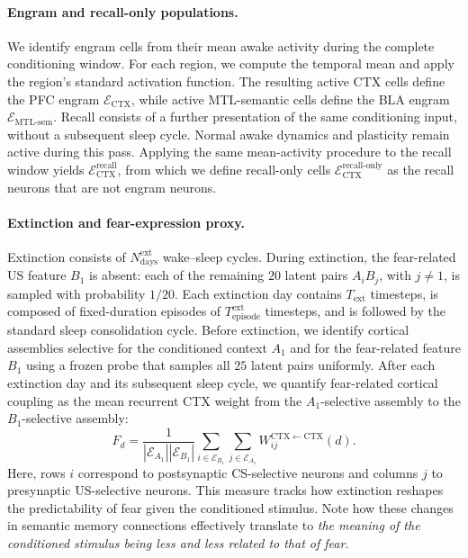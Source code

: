 \documentclass{article}
\begin{document}
\paragraph{Engram and recall-only populations.}
We identify engram cells from their mean awake activity during the complete conditioning window. For each region, we compute the temporal mean and apply the region's standard activation function. The resulting active CTX cells define the PFC engram $\mathcal{E}_{\textrm{CTX}}$, while active MTL-semantic cells define the BLA engram $\mathcal{E}_{\textrm{MTL-sem}}$.
\newline\newline
Recall consists of a further presentation of the same conditioning input, without a subsequent sleep cycle. Normal awake dynamics and plasticity remain active during this pass. Applying the same mean-activity procedure to the recall window yields $\mathcal{E}_{\textrm{CTX}}^{\textrm{recall}}$, from which we define recall-only cells $\mathcal{E}_{\textrm{CTX}}^{\textrm{recall-only}}$ as the recall neurons that are not engram neurons.
\newline\newline
\paragraph{Extinction and fear-expression proxy.}
Extinction consists of $N_{\textrm{days}}^{\textrm{ext}}$ wake--sleep cycles. During extinction, the fear-related US feature $B_1$ is absent: each of the remaining $20$ latent pairs $A_iB_j$, with $j\neq1$, is sampled with probability $1/20$. Each extinction day contains $T_{\textrm{ext}}$ timesteps, is composed of fixed-duration episodes of $T_{\textrm{episode}}^{\textrm{ext}}$ timesteps, and is followed by the standard sleep consolidation cycle.
\newline\newline
Before extinction, we identify cortical assemblies selective for the conditioned context $A_1$ and for the fear-related feature $B_1$ using a frozen probe that samples all $25$ latent pairs uniformly. After each extinction day and its subsequent sleep cycle, we quantify fear-related cortical coupling as the mean recurrent CTX weight from the $A_1$-selective assembly to the $B_1$-selective assembly:
\[
F_d
=
\frac{1}
{\left|\mathcal{E}_{A_1}\right|
 \left|\mathcal{E}_{B_1}\right|}
\sum_{i\in\mathcal{E}_{B_1}}
\sum_{j\in\mathcal{E}_{A_1}}
W^{\mathrm{CTX}\leftarrow\mathrm{CTX}}_{ij}(d).
\]
Here, rows $i$ correspond to postsynaptic CS-selective neurons and columns $j$ to presynaptic US-selective neurons. This measure tracks how extinction reshapes the predictability of fear given the conditioned stimulus. Note how these changes in semantic memory connections effectively translate to \textit{the meaning of the conditioned stimulus being less and less related to that of fear}.
\end{document}
